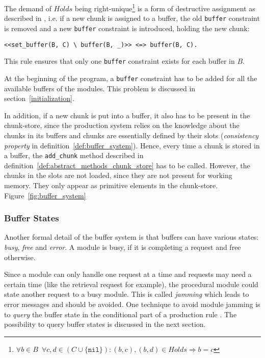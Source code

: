 The demand of $Holds$ being right-unique\footnote{$\forall b \in B \enspace \forall c, d \in (C \cup \{ \mathtt{nil} \}): (b,c), (b,d) \in Holds \Rightarrow b = c$} is a form of destructive assignment as described in \cite[p. 32]{fru_chr_book_2009}, i.e. if a new chunk is assigned to a buffer, the old \verb|buffer| constraint is removed and a new \verb|buffer| constraint is introduced, holding the new chunk:

\begin{lstlisting}
<<set_buffer(B, C) \ buffer(B, _)>> <=> buffer(B, C).
\end{lstlisting}

This rule ensures that only one \verb|buffer| constraint exists for each buffer in $B$.

At the beginning of the program, a \verb|buffer| constraint has to be added for all the available buffers of the modules. This problem is discussed in section~\ref{initialization}.

In addition, if a new chunk is put into a buffer, it also has to be present in the chunk-store, since the production system relies on the knowledge about the chunks in its buffers and chunks are essentially defined by their slots (\emph{consistency property} in definition~\ref{def:buffer_system}). Hence, every time a chunk is stored in a buffer, the \verb|add_chunk| method described in definition~\ref{def:abstract_methods_chunk_store} has to be called. However, the chunks in the slots are not loaded, since they are not present for working memory. They only appear as primitive elements in the chunk-store. Figure~\ref{fig:buffer_system}


\subsubsection{Buffer States}

Another formal detail of the buffer system is that buffers can have various states: \emph{busy}, \emph{free} and \emph{error}. A module is busy, if it is completing a request and free otherwise.

Since a module can only handle one request at a time and requests may need a certain time (like the retrieval request for example), the procedural module could state another request to a busy module. This is called \emph{jamming} which leads to error messages and should be avoided. One technique to avoid module jamming is to \emph{query} the buffer state in the conditional part of a production rule \cite[unit 2, p. 9]{actr_tutorial}. The possibility to query buffer states is discussed in the next section.

